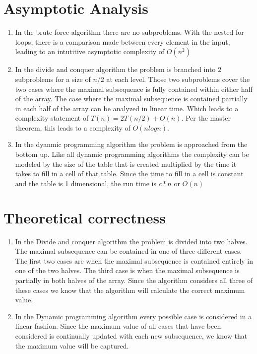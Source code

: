 \documentclass[12pt]{article}
\begin{document}
\section*{Asymptotic Analysis}
    \begin{enumerate}

    \item In the brute force algorithm there are no subproblems.  With the
            nested for loops, there is a comparison made between every element
            in the input, leading to an intutitive asymptotic complexity of 
            $O(n^2)$

	\item In the divide and conquer algorithm the problem is branched into 
            $2$ subproblems for a size of $n/2$ at each level.  Those two
            subproblems cover the two cases where the maximal subsequence
            is fully contained within either half of the array.  The case
            where the maximal subsequence is contained partially in each
            half of the array can be analyzed in linear time.  Which leads
            to a complexity statement of $T(n) = 2T(n/2) + O(n)$.  Per the
            master theorem, this leads to a complexity of $O(n log n)$.

    \item In the dyanmic programming algorithm the problem is approached 
            from the bottom up. Like all dynamic programming algorithms
            the complexity can be modeled by the size of the table that is
            created multiplied by the time it takes to fill in a cell of that
            table.  Since the time to fill in a cell is constant and the table
            is 1 dimensional, the run time is $c*n$ or $O(n)$   
     \end{enumerate}

\section*{Theoretical correctness}
    \begin{enumerate}

    \item In the Divide and conquer algorithm the problem is divided into two
            halves.  The maximal subsequence can be contained in one of three
            different cases.  The first two cases are when the maximal
            subsequence is contained entirely in one of the two halves. The 
            third case is when the maximal subsequence is partially in both
            halves of the array.  Since the algorithm considers all three of
            these cases we know that the algorithm will calculate the correct
            maximum value.

    \item In the Dynamic programming algorithm every possible case is 
            considered in a linear fashion.  Since the maximum value of all
            cases that have been considered is continually updated with each
            new subsequence, we know that the maximum value will be captured.

    \end{enumerate}
\end{document}
